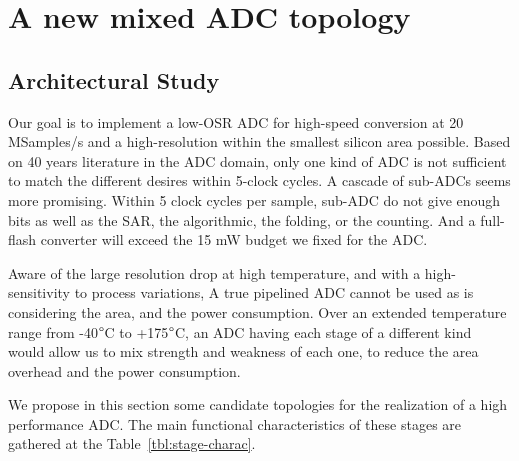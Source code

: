 \chapter{A new mixed ADC topology}
\label{sec:adc-implementation}

\ifpdf 
    \graphicspath{{Chapter4/Figs/Raster/}{Chapter4/Figs/PDF/}{Chapter4/Figs/}}
\else
    \graphicspath{{Chapter4/Figs/Vector/}{Chapter4/Figs/}}
\fi

\section{Architectural Study}
Our goal is to implement a low-OSR ADC for high-speed conversion at 20 MSamples/s and a high-resolution within the smallest silicon area possible. Based on 40 years literature in the ADC domain, only one kind of ADC is not sufficient to match the different desires within 5-clock cycles. A cascade of sub-ADCs seems more promising. Within 5 clock cycles per sample, sub-ADC do not give enough bits as well as the SAR, the algorithmic, the folding, or the counting. And a full-flash converter will exceed the 15 mW budget we fixed for the ADC\@.

Aware of the large resolution drop at high temperature, and with a high-sensitivity to process variations, A true pipelined ADC cannot be used as is considering the area, and the power consumption. Over an extended temperature range from -40\(\degree \)C to +175\(\degree \)C, an ADC having each stage of a different kind would allow us to mix strength and weakness of each one, to reduce the area overhead and the power consumption.

We propose in this section some candidate topologies for the realization of a high performance ADC\@. The main functional characteristics of these stages are gathered at the Table~\ref{tbl:stage-charac}.

